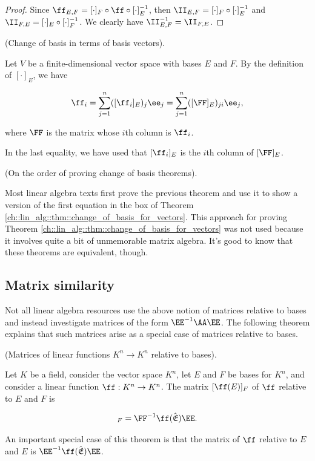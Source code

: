 \begin{proof}
    Since $\ff_{E,F} = [\cdot]_F \circ \ff \circ [\cdot]_E^{-1}$, then $\II_{E,F} = [\cdot]_F \circ [\cdot]_E^{-1}$ and $\II_{F,E} = [\cdot]_E \circ [\cdot]_F^{-1}$. We clearly have $\II_{E,F}^{-1} = \II_{F,E}$.
\end{proof}

\begin{theorem}
\label{ch::lin_alg::thm::change_of_basis_with_basis_vectors}
    (Change of basis in terms of basis vectors).
    
    Let $V$ be a finite-dimensional vector space with bases $E$ and $F$. By the definition of $[\cdot]_E$, we have
    
    \begin{align*}
        \ff_i = \sum_{j = 1}^n ([\ff_i]_E)_j \ee_j = \sum_{j = 1}^n ([\FF]_E)_{ji} \ee_j,
    \end{align*}
    
    where $\FF$ is the matrix whose $i$th column is $\ff_i$.
    
    In the last equality, we have used that $[\ff_i]_E$ is the $i$th column of $[\FF]_E$.
\end{theorem}

\begin{remark}
    (On the order of proving change of basis theorems). 
    
    Most linear algebra texts first prove the previous theorem and use it to show a version of the first equation in the box of Theorem \ref{ch::lin_alg::thm::change_of_basis_for_vectors}. This approach for proving Theorem \ref{ch::lin_alg::thm::change_of_basis_for_vectors} was not used because it involves quite a bit of unmemorable matrix algebra. It's good to know that these theorems are equivalent, though.
\end{remark}

\newpage

\subsection*{Matrix similarity}

Not all linear algebra resources use the above notion of matrices relative to bases and instead investigate matrices of the form $\EE^{-1} \AA \EE$. The following theorem explains that such matrices arise as a special case of matrices relative to bases.

\begin{theorem}
    (Matrices of linear functions $K^n \rightarrow K^n$ relative to bases).
    
    Let $K$ be a field, consider the vector space $K^n$, let $E$ and $F$ be bases for $K^n$, and consider a linear function $\ff:K^n \rightarrow K^n$. The matrix $[\ff(E)]_F$ of $\ff$ relative to $E$ and $F$ is
    
    \begin{align*}
        [\ff(E)]_F = \FF^{-1} \ff(\sE) \EE.
    \end{align*}

    An important special case of this theorem is that the matrix of $\ff$ relative to $E$ and $E$ is $\EE^{-1} \ff(\sE) \EE$.
\end{theorem}

